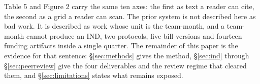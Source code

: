 Table 5 and Figure 2 carry the same ten axes: the first as text a reader can
cite, the second as a grid a reader can scan. The prior system is not described
here as bad work. It is described as work whose unit is the team-month, and a
team-month cannot produce an IND, two protocols, five bill versions and fourteen
funding artifacts inside a single quarter. The remainder of this paper is the
evidence for that sentence: \S\ref{sec:methods} gives the method, \S\ref{sec:ind} through \S\ref{sec:peerreview} give the four
deliverables and the review regime that cleared them, and \S\ref{sec:limitations} states what
remains exposed.

